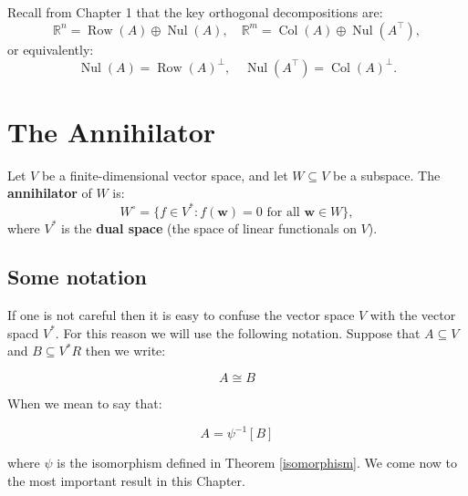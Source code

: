 Recall from Chapter 1 that
the key orthogonal decompositions are:
\[
\mathbb{R}^n = \operatorname{Row}(A) \oplus \operatorname{Nul}(A), \quad
\mathbb{R}^m = \operatorname{Col}(A) \oplus \operatorname{Nul}(A^\top),
\]
or equivalently:
\[
\operatorname{Nul}(A) = \operatorname{Row}(A)^\perp, \quad
\operatorname{Nul}(A^\top) = \operatorname{Col}(A)^\perp.
\]

\section*{\Large The Annihilator}

Let $ V $ be a finite-dimensional vector space, and let $ W \subseteq V $ be a subspace.  
The \textbf{annihilator} of $ W $ is:
\[
W^\circ = \{ f \in V^* : f(\mathbf{w}) = 0 \text{ for all } \mathbf{w} \in W \},
\]
where $ V^* $ is the \textbf{dual space} (the space of linear functionals on $ V $).


\subsection{\Large Some notation}

If one is not careful then it is easy to confuse the vector space $V$ with the vector spacd $V^*$. For this reason we will use the following notation. Suppose that $A \subseteq V$ and $B \subseteq V^*R$ then we write:

\[ A \cong B \]

When we mean to say that: 

\[A = \psi^{-1} [B]\]

where $\psi$ is the isomorphism defined in Theorem \ref{isomorphism}. We come now to the most important result in this Chapter.

